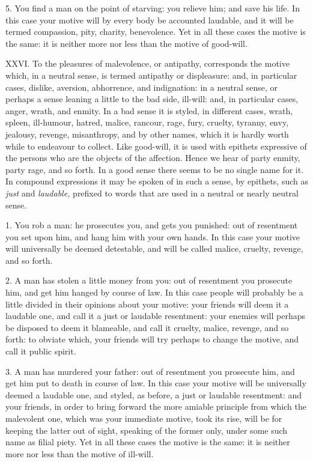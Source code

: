 \documentclass[12pt]{report}
\begin{document}
5. You find a man on the point of starving: you relieve him; and save
his life. In this case your motive will by every body be accounted
laudable, and it will be termed compassion, pity, charity, benevolence.
Yet in all these cases the motive is the same: it is neither more nor
less than the motive of good-will.

XXVI. To the pleasures of malevolence, or antipathy, corresponds the
motive which, in a neutral sense, is termed antipathy or displeasure:
and, in particular cases, dislike, aversion, abhorrence, and
indignation: in a neutral sense, or perhaps a sense leaning a little to
the bad side, ill-will: and, in particular cases, anger, wrath, and
enmity. In a bad sense it is styled, in different cases, wrath, spleen,
ill-humour, hatred, malice, rancour, rage, fury, cruelty, tyranny, envy,
jealousy, revenge, misanthropy, and by other names, which it is hardly
worth while to endeavour to collect. Like good-will, it is used with
epithets expressive of the persons who are the objects of the affection.
Hence we hear of party enmity, party rage, and so forth. In a good sense
there seems to be no single name for it. In compound expressions it may
be spoken of in such a sense, by epithets, such as \emph{just} and
\emph{laudable,} prefixed to words that are used in a neutral or nearly
neutral sense.

1. You rob a man: he prosecutes you, and gets you punished: out of
resentment you set upon him, and hang him with your own hands. In this
case your motive will universally be deemed detestable, and will be
called malice, cruelty, revenge, and so forth.

2. A man has stolen a little money from you: out of resentment you
prosecute him, and get him hanged by course of law. In this case people
will probably be a little divided in their opinions about your motive:
your friends will deem it a laudable one, and call it a just or laudable
resentment: your enemies will perhaps be disposed to deem it blameable,
and call it cruelty, malice, revenge, and so forth: to obviate which,
your friends will try perhaps to change the motive, and call it public
spirit.

3. A man has murdered your father: out of resentment you prosecute him,
and get him put to death in course of law. In this case your motive will
be universally deemed a laudable one, and styled, as before, a just or
laudable resentment: and your friends, in order to bring forward the
more amiable principle from which the malevolent one, which was your
immediate motive, took its rise, will be for keeping the latter out of
sight, speaking of the former only, under some such name as filial
piety. Yet in all these cases the motive is the same: it is neither more
nor less than the motive of ill-will.
\end{document}

